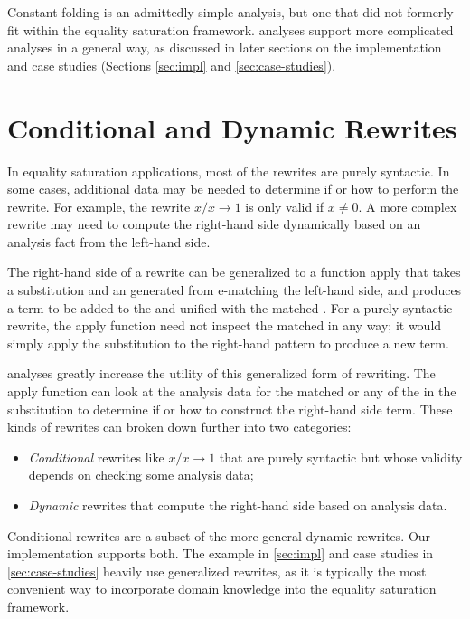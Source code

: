 Constant folding is an admittedly simple analysis, but one that did not formerly
  fit within the equality saturation framework.
\Eclass analyses support more complicated analyses in a general way, as
  discussed in later sections on the \egg implementation and case studies
  (Sections \ref{sec:impl} and \ref{sec:case-studies}).

\section{Conditional and Dynamic Rewrites}
\label{sec:rewrites}

In equality saturation applications, most of the rewrites are purely
  syntactic.
In some cases, additional data may be needed to determine if or how to perform
  the rewrite.
For example, the rewrite $x / x \to 1$ is only valid if $x \neq 0$.
A more complex rewrite may need to compute the right-hand side dynamically based
  on an analysis fact from the left-hand side.

The right-hand side of a rewrite can be generalized to a function
  \textsf{apply} that takes a substitution and an \eclass generated from
  e-matching the left-hand side, and produces a term to be added to the \egraph
  and unified with the matched \eclass.
For a purely syntactic rewrite, the \textsf{apply} function need not inspect the
  matched \eclass in any way; it would simply apply
  the substitution to the right-hand pattern to produce a new term.

\Eclass analyses greatly increase the utility of this generalized form of
  rewriting.
The \textsf{apply} function can look at the analysis data for the matched
  \eclass or any of the \eclasses in the substitution to determine if or how to
  construct the right-hand side term.
These kinds of rewrites can broken down further into two categories:
\begin{itemize}
  \item \textit{Conditional} rewrites like $x / x \to 1$ that are purely
  syntactic but whose validity depends on checking some analysis data;
  \item \textit{Dynamic} rewrites that compute the right-hand side based on
  analysis data.
\end{itemize}

Conditional rewrites are a subset of the more general dynamic rewrites.
Our \egg implementation supports both.
The example in \autoref{sec:impl} and case studies in \autoref{sec:case-studies}
  heavily use generalized rewrites, as it is typically the most convenient way
  to incorporate domain knowledge into the equality saturation
  framework.

